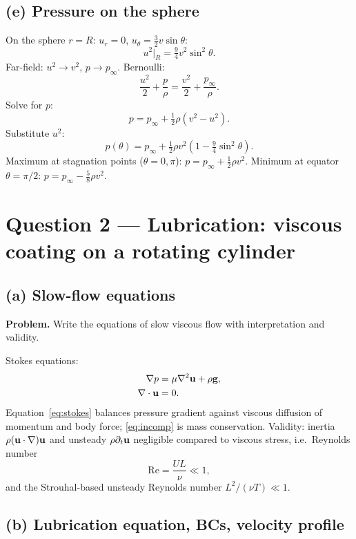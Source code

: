 \documentclass[11pt]{article}
\newcommand{\Lap}{\nabla^{2}}
\begin{document}
\subsection*{(e) Pressure on the sphere}

On the sphere $r=R$: $u_r=0$, $u_\theta = \tfrac{3}{2}v\sin\theta$:
\[ u^2|_{R} = \tfrac{9}{4}v^2\sin^2\theta. \]
Far-field: $u^2\to v^2$, $p\to p_\infty$. Bernoulli:
\[ \frac{u^2}{2} + \frac{p}{\rho} = \frac{v^2}{2} + \frac{p_\infty}{\rho}. \]
Solve for $p$:
\[ p = p_\infty + \tfrac{1}{2}\rho\!\left(v^2 - u^2\right). \]
Substitute $u^2$:
\[ \boxed{\;p(\theta) = p_\infty + \tfrac{1}{2}\rho v^2\!\left(1 - \tfrac{9}{4}\sin^2\theta\right).\;} \]
Maximum at stagnation points ($\theta=0,\pi$): $p = p_\infty + \tfrac{1}{2}\rho v^2$. Minimum at equator $\theta=\pi/2$: $p = p_\infty - \tfrac{5}{8}\rho v^2$.

\section*{Question 2 --- Lubrication: viscous coating on a rotating cylinder}

\subsection*{(a) Slow-flow equations}

\textbf{Problem.} Write the equations of slow viscous flow with interpretation and validity.

Stokes equations:
\begin{align}
\nabla p &= \mu\Lap\vb u + \rho\vb g, \label{eq:stokes}\\
\nabla\cdot\vb u &= 0. \label{eq:incomp}
\end{align}
Equation~\eqref{eq:stokes} balances pressure gradient against viscous diffusion of momentum and body force; \eqref{eq:incomp} is mass conservation. Validity: inertia $\rho(\vb u\cdot\nabla)\vb u$ and unsteady $\rho\partial_t\vb u$ negligible compared to viscous stress, i.e.\ Reynolds number
\[ \mathrm{Re} = \frac{UL}{\nu} \ll 1, \]
and the Strouhal-based unsteady Reynolds number $L^2/(\nu T)\ll 1$.

\subsection*{(b) Lubrication equation, BCs, velocity profile}
\end{document}
